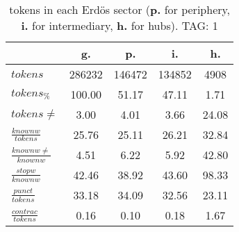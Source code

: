 \begin{table}[h!]
\begin{center}
\begin{tabular}{| l | c | c | c | c |}\hline
 & g. & p. & i. & h. \\\hline
$tokens$ & 286232  & 146472  & 134852  & 4908 \\\hline
$tokens_{\%}$ & 100.00  & 51.17  & 47.11  & 1.71 \\\hline
$tokens \neq$ & 3.00  & 4.01  & 3.66  & 24.08 \\\hline
$\frac{knownw}{tokens}$ & 25.76  & 25.11  & 26.21  & 32.84 \\\hline
$\frac{knownw \neq}{knownw}$ & 4.51  & 6.22  & 5.92  & 42.80 \\\hline
$\frac{stopw}{knownw}$ & 42.46  & 38.92  & 43.60  & 98.33 \\\hline
$\frac{punct}{tokens}$ & 33.18  & 34.09  & 32.56  & 23.11 \\\hline
$\frac{contrac}{tokens}$ & 0.16  & 0.10  & 0.18  & 1.67 \\\hline
\end{tabular}
\caption{tokens in each Erd\"os sector ({{\bf p.}} for periphery, {{\bf i.}} for intermediary, 
    {{\bf h.}} for hubs). TAG: 1}
\end{center}
\end{table}